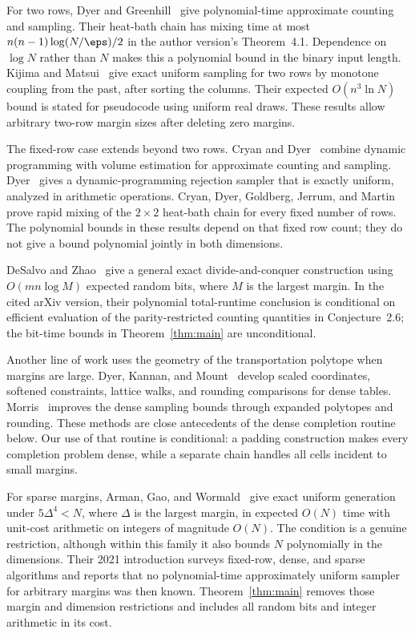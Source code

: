 For two rows, Dyer and Greenhill~\cite{DyerGreenhill2000} give polynomial-time
approximate counting and sampling. Their heat-bath chain has mixing time
at most $n(n-1)\log(N/\eps)/2$ in the author version's Theorem~4.1.
Dependence on $\log N$ rather than $N$ makes this a polynomial bound in
the binary input length.
Kijima and Matsui~\cite[Theorems~3.1 and~5.1]{KM2003} give exact uniform
sampling for two rows by monotone coupling from the past, after sorting
the columns. Their expected $O(n^3\ln N)$ bound is stated for pseudocode
using uniform real draws. These results allow arbitrary two-row margin
sizes after deleting zero margins.

The fixed-row case extends beyond two rows. Cryan and
Dyer~\cite{CD2003} combine dynamic programming with volume estimation for
approximate counting and sampling. Dyer~\cite[Section~3]{Dyer2003} gives a
dynamic-programming rejection sampler that is exactly uniform, analyzed
in arithmetic operations. Cryan, Dyer, Goldberg,
Jerrum, and Martin~\cite{CDGJM2006} prove rapid mixing of the
$2\times2$ heat-bath chain for every fixed number of rows.
The polynomial bounds in these results depend on that fixed row count;
they do not give a bound polynomial jointly in both dimensions.

DeSalvo and Zhao~\cite[Theorem~2.3 and Remarks~2.4--2.5]{DZ2016} give a
general exact divide-and-conquer construction using $O(mn\log M)$ expected
random bits, where $M$ is the largest margin. In the cited arXiv version,
their polynomial total-runtime conclusion is conditional on efficient
evaluation of the parity-restricted counting quantities in Conjecture~2.6;
the bit-time bounds in Theorem~\ref{thm:main} are unconditional.

Another line of work uses the geometry of the transportation polytope
when margins are large. Dyer, Kannan, and Mount~\cite{DKM1997} develop
scaled coordinates, softened constraints, lattice walks, and rounding
comparisons for dense tables. Morris~\cite{Morris2002} improves the dense
sampling bounds through expanded polytopes and rounding. These methods
are close antecedents of the dense completion routine below. Our use of
that routine is conditional: a padding construction makes every
completion problem dense, while a separate chain handles all cells
incident to small margins.

For sparse margins, Arman, Gao, and Wormald~\cite[Theorem~1 and
Remark~2]{AGW2021} give exact uniform generation under $5\Delta^4<N$,
where $\Delta$ is the largest margin, in expected $O(N)$ time with
unit-cost arithmetic on integers of magnitude $O(N)$. The condition is
a genuine restriction, although within this family it also bounds $N$
polynomially in the dimensions. Their 2021 introduction surveys fixed-row,
dense, and sparse algorithms and reports that no polynomial-time
approximately uniform sampler for arbitrary margins was then known.
Theorem~\ref{thm:main} removes those margin and dimension restrictions
and includes all random bits and integer arithmetic in its cost.

